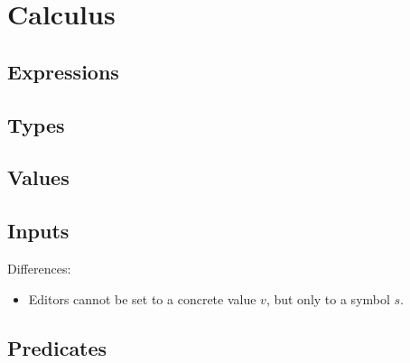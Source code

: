 

\pagebreak
\section{Calculus}
\label{sec:language}


\subsection{Expressions}



\subsection{Types}



\subsection{Values}



\subsection{Inputs}

Differences:
\begin{itemize}
  \item Editors cannot be set to a concrete value $v$, but only to a symbol $s$.
\end{itemize}



\subsection{Predicates}

